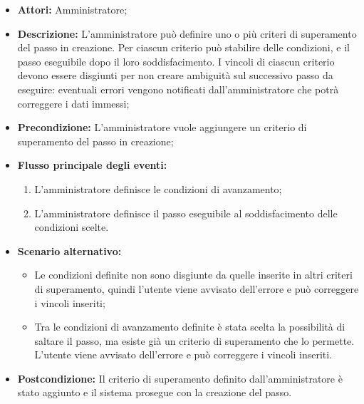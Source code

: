 \begin{itemize}
\item \textbf{Attori:}
Amministratore;
\item \textbf{Descrizione:}
L'amministratore può definire uno o più criteri di superamento del passo in creazione.
Per ciascun criterio può stabilire delle condizioni, e il passo eseguibile dopo il loro soddisfacimento.
I vincoli di ciascun criterio devono essere disgiunti per non creare ambiguità sul successivo passo da eseguire: eventuali errori vengono notificati dall'amministratore che potrà correggere i dati immessi;
\item \textbf{Precondizione:}
L'amministratore vuole aggiungere un criterio di superamento del passo in creazione;
\item \textbf{Flusso principale degli eventi:}
\begin{enumerate}
\item L'amministratore definisce le condizioni di avanzamento;
\item L'amministratore definisce il passo eseguibile al soddisfacimento delle condizioni scelte.
\end{enumerate}
\item \textbf{Scenario alternativo:}
\begin{itemize}
\item Le condizioni definite non sono disgiunte da quelle inserite in altri criteri di superamento, quindi l'utente viene avvisato dell'errore e può correggere i vincoli inseriti;
\item Tra le condizioni di avanzamento definite è stata scelta la possibilità di saltare il passo, ma esiste già un criterio di superamento che lo permette. L'utente viene avvisato dell'errore e può correggere i vincoli inseriti.
\end{itemize}
\item \textbf{Postcondizione:}
Il criterio di superamento definito dall'amministratore è stato aggiunto e il sistema prosegue con la creazione del passo.
\end{itemize}

\hypertarget{A1.3.1.3.1}{}
